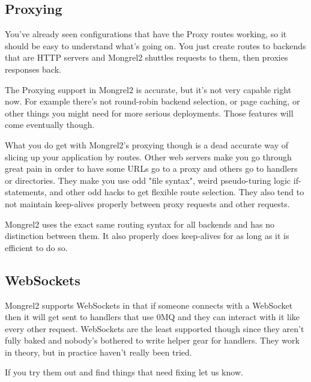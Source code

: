 \subsection{Proxying}

You've already seen configurations that have the Proxy routes working, so it should
be easy to understand what's going on.  You just create routes to backends that are
HTTP servers and Mongrel2 shuttles requests to them, then proxies responses back.

The Proxying support in Mongrel2 is accurate, but it's not very capable right now.  For
example there's not round-robin backend selection, or page caching, or other things you
might need for more serious deployments.  Those features will come eventually though.

What you do get with Mongrel2's proxying though is a dead accurate way of slicing up
your application by routes.  Other web servers make you go through great pain in order
to have some URLs go to a proxy and others go to handlers or directories.  They make you
use odd "file syntax", weird pseudo-turing logic if-statements, and other odd hacks
to get flexible route selection.  They also tend to not maintain keep-alives properly
between proxy requests and other requests.

Mongrel2 uses the exact same routing syntax for all backends and has no distinction between
them.  It also properly does keep-alives for as long as it is efficient to do so.


\subsection{WebSockets}

Mongrel2 supports WebSockets in that if someone connects with a WebSocket then it will get
sent to handlers that use 0MQ and they can interact with it like every other request.  WebSockets
are the least supported though since they aren't fully baked and nobody's bothered to write
helper gear for handlers.  They work in theory, but in practice haven't really been tried.

If you try them out and find things that need fixing let us know.


